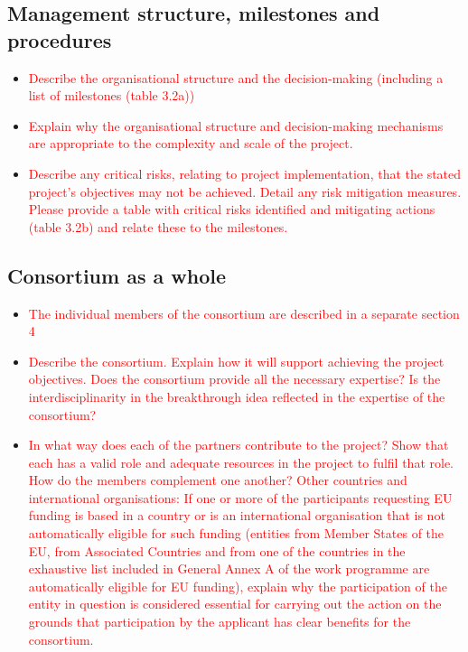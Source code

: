 \documentclass[12pt, a4paper]{article} %
\begin{document}
  \subsection{Management structure, milestones and procedures}
  \begin{itemize}
  \item \textcolor{red}{Describe the organisational structure and the
      decision-making (including a list of milestones (table 3.2a))}
\item \textcolor{red}{Explain why the organisational structure and
  decision-making mechanisms are appropriate to the complexity and
  scale of the project.}
\item \textcolor{red}{Describe any critical risks, relating to project
    implementation, that the stated project's objectives may not be
    achieved. Detail any risk mitigation measures. Please provide a
    table with critical risks identified and mitigating actions (table
    3.2b) and relate these to the milestones.}
  \end{itemize}

  \subsection{Consortium as a whole}

  \begin{itemize}
    \item \textcolor{red}{The individual members of the consortium are
        described in a separate section 4}
      \item \textcolor{red}{Describe the consortium. Explain how it will
    support achieving the project objectives.  Does the consortium
    provide all the necessary expertise? Is the interdisciplinarity in
    the breakthrough idea reflected in the expertise of the
    consortium?}
\item \textcolor{red}{In what way does each of the partners contribute
    to the project? Show that each has a valid role and adequate
    resources in the project to fulfil that role. How do the members
    complement one another? Other countries and international
    organisations: If one or more of the participants requesting EU
    funding is based in a country or is an international organisation
    that is not automatically eligible for such funding (entities from
    Member States of the EU, from Associated Countries and from one of
    the countries in the exhaustive list included in General Annex A
    of the work programme are automatically eligible for EU funding),
    explain why the participation of the entity in question is
    considered essential for carrying out the action on the grounds
    that participation by the applicant has clear benefits for the
    consortium.}
  \end{itemize}
\end{document}
